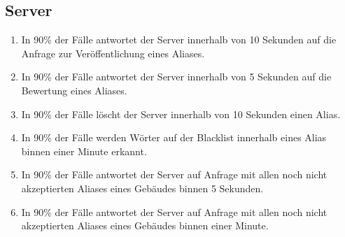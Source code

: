 \subsection{Server}

\begin{enumerate}
    \item In 90\% der Fälle antwortet der Server innerhalb von 10 Sekunden auf die Anfrage zur Veröffentlichung eines Aliases.
    \item In 90\% der Fälle antwortet der Server innerhalb von 5 Sekunden auf die Bewertung eines Aliases.
    \item In 90\% der Fälle löscht der Server innerhalb von 10 Sekunden einen Alias.
    \item In 90\% der Fälle werden Wörter auf der Blacklist innerhalb eines Alias binnen einer Minute erkannt.
    \item In 90\% der Fälle antwortet der Server auf Anfrage mit allen noch nicht akzeptierten Aliases eines Gebäudes binnen 5 Sekunden.
    \item In 90\% der Fälle antwortet der Server auf Anfrage mit allen noch nicht akzeptierten Aliases eines Gebäudes binnen einer Minute.
\end{enumerate}